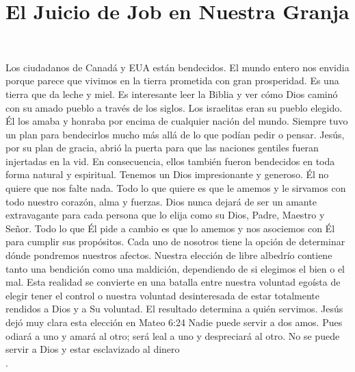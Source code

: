\documentclass[twoside, 12pt]{book}
\begin{document}
\chapter{El Juicio de Job en Nuestra Granja}
\

Los ciudadanos de Canadá y EUA están bendecidos. El mundo entero nos envidia porque parece que vivimos en la tierra prometida con gran prosperidad. Es una tierra que da leche y miel. Es interesante leer la Biblia y ver cómo Dios caminó con su amado pueblo a través de los siglos. Los israelitas eran su pueblo elegido. Él los amaba y honraba por encima de cualquier nación del mundo. Siempre tuvo un plan para bendecirlos mucho más allá de lo que podían pedir o pensar. Jesús, por su plan de gracia, abrió la puerta para que las naciones gentiles fueran injertadas en la vid. En consecuencia, ellos también fueron bendecidos en toda forma natural y espiritual. Tenemos un Dios impresionante y generoso. Él no quiere que nos falte nada. Todo lo que quiere es que le amemos y le sirvamos con todo nuestro corazón, alma y fuerzas. Dios nunca dejará de ser un amante extravagante para cada persona que lo elija como su Dios, Padre, Maestro y Señor. Todo lo que Él pide a cambio es que lo amemos y nos asociemos con Él para cumplir sus propósitos. Cada uno de nosotros tiene la opción de determinar dónde pondremos nuestros afectos. Nuestra elección de libre albedrío contiene tanto una bendición como una maldición, dependiendo de si elegimos el bien o el mal. Esta realidad se convierte en una batalla entre nuestra voluntad egoísta de elegir tener el control o nuestra voluntad desinteresada de estar totalmente rendidos a Dios y a Su voluntad. El resultado determina a quién servimos. Jesús dejó muy clara esta elección en Mateo 6:24 Nadie puede servir a dos amos. Pues odiará a uno y amará al otro; será leal a uno y despreciará al otro. No se puede servir a Dios y estar esclavizado al dinero\\
.
\end{document}
